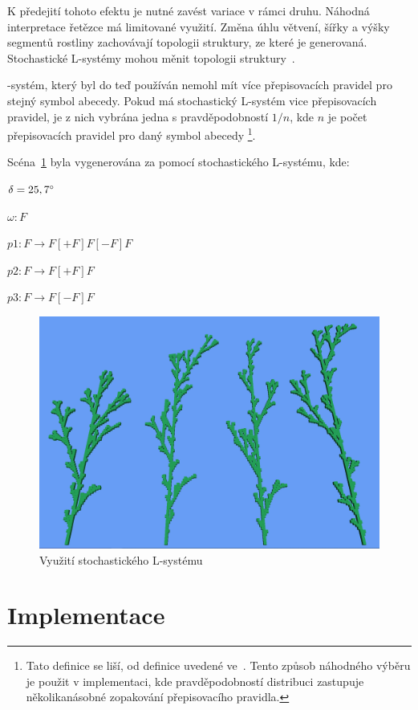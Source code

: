 \documentclass[thesis=M,czech]{FITthesis}[2019/12/23]
\begin{document}
K předejití tohoto efektu je nutné zavést variace v rámci druhu. Náhodná interpretace řetězce má limitované využití. Změna úhlu větvení, šířky a výšky segmentů rostliny zachovávají topologii struktury, ze které je generovaná. Stochastické L-systémy mohou měnit topologii struktury~\cite{abop28}.

-systém, který byl do teď používán nemohl mít více přepisovacích pravidel pro stejný symbol abecedy. Pokud má stochastický L-systém vice přepisovacích pravidel, je z nich vybrána jedna s pravděpodobností $1/n$, kde $n$ je počet přepisovacích pravidel pro daný symbol abecedy
\footnote{Tato definice se liší, od definice uvedené ve~\cite{abop28}. Tento způsob náhodného výběru je použit v implementaci, kde pravděpodobností distribuci zastupuje několikanásobné zopakování přepisovacího pravidla.}.

Scéna~\ref{fig:plant_stoch} byla vygenerována za pomocí stochastického L-systému, kde:

\bigskip 
$\delta = 25,7\degree$

\medskip
$\omega: F$

\medskip
$p1: F \rightarrow F[+F]F[-F]F$

\medskip
$p2: F \rightarrow F[+F]F$

\medskip
$p3: F \rightarrow F[-F]F$

\begin{figure}\centering
	\includegraphics[width=\textwidth]{images/plant_stoch}
	\caption[Využití stochastického L-systému]{Využití stochastického L-systému}\label{fig:plant_stoch}
\end{figure}

\section{Implementace}
\end{document}
